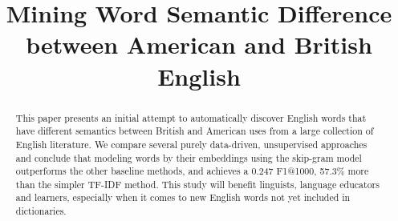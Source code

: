 \documentclass{sig-alternate-05-2015}
\begin{document}

\doi{}

\isbn{}



\title{Mining Word Semantic
Difference between American and British English}

\maketitle
\begin{abstract}
This paper presents an initial attempt to automatically discover
English words that have different semantics between British and
American uses from a large collection of English literature.
We compare several purely data-driven, unsupervised approaches
and conclude that modeling words by their embeddings using the skip-gram
model outperforms the other baseline methods, and achieves a 0.247 F1@1000,
57.3\% more than the simpler TF-IDF method.
This study will benefit linguists, language educators and learners, especially
when it comes to new English words not yet included in dictionaries.
\end{abstract}


%


%
%

%
%
\printccsdesc















\end{document}
